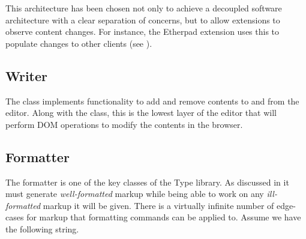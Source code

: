 This architecture has been chosen not only to achieve a decoupled software architecture with a clear separation of concerns, but to allow extensions to observe content changes. For instance, the Etherpad extension uses this to populate changes to other clients (see ).





\subsection{Writer}

The  class implements functionality to add and remove contents to and from the editor. Along with the  class, this is the lowest layer of the editor that will perform DOM operations to modify the contents in the browser.


\subsection{Formatter}

The formatter is one of the key classes of the Type library. As discussed in  it must generate \textit{well-formatted} markup while being able to work on any \textit{ill-formatted} markup it will be given. There is a virtually infinite number of edge-cases for markup that formatting commands can be applied to. Assume we have the following string.




